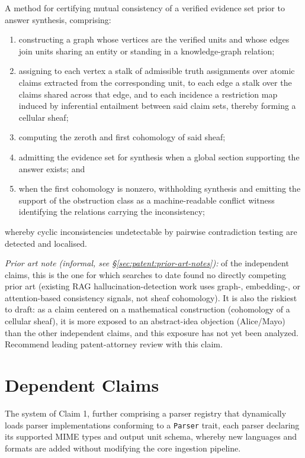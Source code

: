 \begin{claim}
\label{claim:consistency}
A method for certifying mutual consistency of a verified evidence set prior to answer synthesis, comprising:
\begin{enumerate}
  \item constructing a graph whose vertices are the verified units and whose edges join units sharing an entity or standing in a knowledge-graph relation;
  \item assigning to each vertex a stalk of admissible truth assignments over atomic claims extracted from the corresponding unit, to each edge a stalk over the claims shared across that edge, and to each incidence a restriction map induced by inferential entailment between said claim sets, thereby forming a cellular sheaf;
  \item computing the zeroth and first cohomology of said sheaf;
  \item admitting the evidence set for synthesis when a global section supporting the answer exists; and
  \item when the first cohomology is nonzero, withholding synthesis and emitting the support of the obstruction class as a machine-readable conflict witness identifying the relations carrying the inconsistency;
\end{enumerate}
whereby cyclic inconsistencies undetectable by pairwise contradiction testing are detected and localised.
\end{claim}

\par\noindent\emph{Prior art note (informal, see \S\ref{sec:patent:prior-art-notes}):} of the independent claims, this is the one for which searches to date found no directly competing prior art (existing RAG hallucination-detection work uses graph-, embedding-, or attention-based consistency signals, not sheaf cohomology). It is also the riskiest to draft: as a claim centered on a mathematical construction (cohomology of a cellular sheaf), it is more exposed to an abstract-idea objection (Alice/Mayo) than the other independent claims, and this exposure has not yet been analyzed. Recommend leading patent-attorney review with this claim.

\section{Dependent Claims}
\label{sec:patent:dependent}

\begin{claim}
\label{claim:parser-ext}
The system of Claim 1, further comprising a parser registry that dynamically loads parser implementations conforming to a \texttt{Parser} trait, each parser declaring its supported MIME types and output unit schema, whereby new languages and formats are added without modifying the core ingestion pipeline.
\end{claim}

